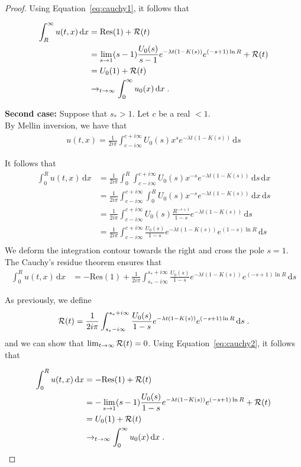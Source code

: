 \documentclass[11pt]{amsart}
\newcommand{\diff}{\,\mathrm{d}}
\begin{document}
\begin{proof}
Using Equation~\ref{eq:cauchy1}, it follows that 

\begin{align*}
    \int_R^\infty u(t,x) \diff x &= \mathrm{Res(1)} + \Rcal(t) \\
    &= \lim_{s \to 1} (s-1)\frac{U_0(s)}{s-1} e^{-\lambda t(1 - K(s))} e^{(-s+1)\ln R}  + \Rcal(t)\\
    &= U_0(1) + \Rcal(t)\\
    &\to_{t \to \infty} \int_0^\infty u_0(x) \diff x
    \eqfinp
\end{align*}

\textbf{Second case:} Suppose that $s_* > 1$. Let $c$ be a real $<1$. \\
By Mellin inversion, we have that
\begin{align*}
    u(t,x) = \frac{1}{2i\pi}\int_{c-i\infty}^{c+i\infty} U_0(s) x^{s} e^{-\lambda t(1 - K(s))} \diff s
\end{align*}

It follows that
\begin{align*}
    \int_0^R u(t,x) \diff x 
    &= \frac{1}{2i\pi} \int_0^R \int_{c-i\infty}^{c+i\infty} U_0(s) x^{-s} e^{-\lambda t(1 - K(s))} \diff s \diff x \\
    &= \frac{1}{2i\pi} \int_{c-i\infty}^{c+i\infty} \int_0^R U_0(s) x^{-s} e^{-\lambda t(1 - K(s))} \diff x \diff s \\
    &= \frac{1}{2i\pi} \int_{c-i\infty}^{c+i\infty} U_0(s) \frac{R^{-s+1}}{1-s} e^{-\lambda t(1 - K(s))} \diff s \\
    &= \frac{1}{2i\pi} \int_{c-i\infty}^{c+i\infty} \frac{U_0(s)}{1-s} e^{-\lambda t(1 - K(s))} e^{(1-s)\ln R} \diff s \\
\end{align*}
We deform the integration contour towards the right and cross the pole $s = 1$. The Cauchy's residue theorem ensures that
\begin{align}
    \int_0^R u(t,x) \diff x &= -\mathrm{Res(1)} + \frac{1}{2i\pi} \int_{s_*-i\infty}^{s_*+i\infty} \frac{U_0(s)}{1-s} e^{-\lambda t(1 - K(s))} e^{(-s+1)\ln R} \diff s
    \label{eq:cauchy2}
\end{align}

As previously, we define
\begin{align*}
    \Rcal(t) = \frac{1}{2i\pi} \int_{s_*-i\infty}^{s_*+i\infty} \frac{U_0(s)}{1-s} e^{-\lambda t(1 - K(s))} e^{(-s+1)\ln R} \diff s
    \eqfinp
\end{align*}
and we can show that $\lim_{t\to\infty}\mathcal{R}(t) = 0$. Using Equation~\ref{eq:cauchy2}, it follows that 

\begin{align*}
    \int_0^R u(t,x) \diff x &= -\mathrm{Res(1)} + \Rcal(t) \\
    &= -\lim_{s \to 1} (s-1)\frac{U_0(s)}{1-s} e^{-\lambda t(1 - K(s))} e^{(-s+1)\ln R}  + \Rcal(t)\\
    &= U_0(1) + \Rcal(t)\\
    &\to_{t \to \infty} \int_0^\infty u_0(x) \diff x
    \eqfinp
\end{align*}
\end{proof}
\end{document}
